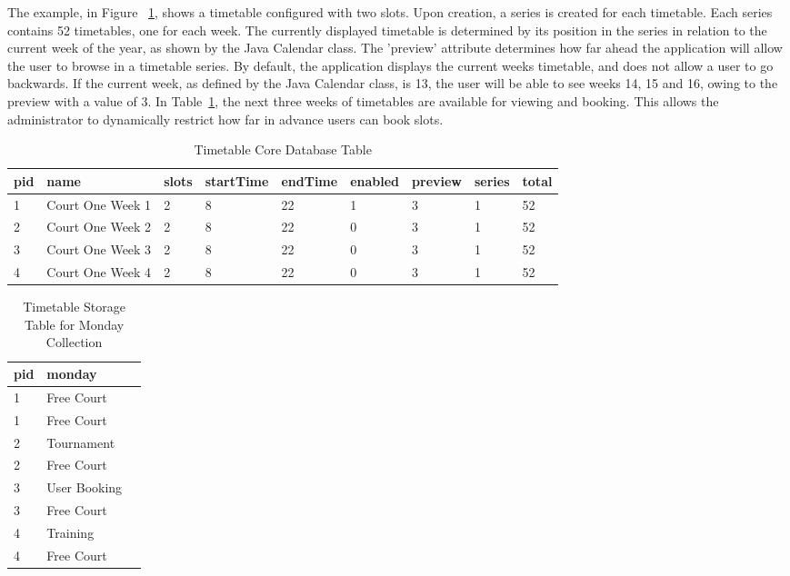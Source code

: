 The example, in Figure ~\ref{fig:ttdb}, shows a timetable configured with two slots. Upon creation, a series is created for each timetable. Each series contains 52 timetables, one for each week. The currently displayed timetable is determined by its position in the series in relation to the current week of the year, as shown by the Java Calendar class. The 'preview' attribute determines how far ahead the application will allow the user to browse in a timetable series. By default, the application displays the current weeks timetable, and does not allow a user to go backwards. If the current week, as defined by the Java Calendar class, is 13, the user will be able to see weeks 14, 15 and 16, owing to the preview with a value of 3. In Table~\ref{fig:ttdb}, the next three weeks of timetables are available for viewing and booking. This allows the administrator to dynamically restrict how far in advance users can book slots.

\begin{table}[H]
	\caption{Timetable Core Database Table}
    \begin{tabular}{| l | l | l | l | l | l | l | l | p{.8cm} |}
    \hline
    pid & name & slots & startTime & endTime & enabled & preview & series & total\\ \hline
    1 & Court One Week 1 & 2 & 8 & 22 & 1 & 3 & 1 & 52\\ \hline
	2 & Court One Week 2 & 2 & 8 & 22 & 0 & 3 & 1 & 52\\ \hline
	3 & Court One Week 3 & 2 & 8 & 22 & 0 & 3 & 1 & 52\\ \hline
	4 & Court One Week 4 & 2 & 8 & 22 & 0 & 3 & 1 & 52\\ \hline
    \end{tabular}

	\label{fig:ttdb}
\end{table}

\begin{table}[H]
	\caption{Timetable Storage Table for Monday Collection}
\begin {center}
    \begin{tabular}{| l | l | p{.8cm} |}
	\hline
	pid & monday \\ \hline
	1 & Free Court \\ \hline
	1 & Free Court \\ \hline
	2 & Tournament \\ \hline
	2 & Free Court \\ \hline
	3 & User Booking \\ \hline
	3 & Free Court \\ \hline
	4 & Training \\ \hline
	4 & Free Court \\ \hline
	\end{tabular}
	\end{center}
\end{table}

